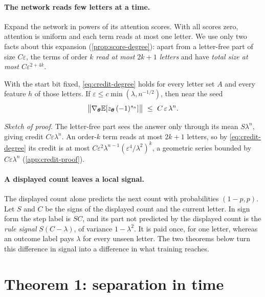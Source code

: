 \paragraph{The network reads few letters at a time.} Expand the network in powers of its attention scores.
With all scores zero, attention is uniform and each term reads at most one letter. We use only two facts
about this expansion (\cref{prop:score-degree}): apart from a letter-free part of size $C\varepsilon$, the terms of
order $k$ \emph{read at most $2k+1$ letters} and have \emph{total size at most $C\varepsilon^{2+4k}$}.

\begin{lemma}
\label{thm:main}
With the start bit fixed, \cref{eq:credit-degree} holds for every letter set $A$ and every feature $h$ of
those letters. If $\varepsilon\le c\min(\lambda,n^{-1/2})$, then near the seed
\[
 \bigl\|\nabla_{\bm\theta}\E[z_{\bm\theta}\,(-1)^{s_n}]\bigr\|\ \le\ C\,\varepsilon\,\lambda^{n}.
\]
\end{lemma}

\emph{Sketch of proof.} The letter-free part sees the answer only through its mean $S\lambda^n$, giving credit
$C\varepsilon\lambda^n$. An order-$k$ term reads at most $2k+1$ letters, so by \cref{eq:credit-degree} its credit is at most
$C\varepsilon^2\lambda^{n-1}(\varepsilon^4/\lambda^2)^k$, a geometric series bounded by $C\varepsilon\lambda^n$ (\cref{app:credit-proof}).

\paragraph{A displayed count leaves a local signal.} The displayed count alone predicts the next count with
probabilities $(1-p,p)$. Let $S$ and $C$ be the signs of the displayed count and the current letter. In sign form the
step label is $SC$, and its part not predicted by the displayed count is the \emph{rule signal} $S(C-\lambda)$, of variance
$1-\lambda^2$. It is paid once, for one letter, whereas an outcome label pays $\lambda$ for every unseen letter. The two
theorems below turn this difference in signal into a difference in what training reaches.

\section{Theorem 1: separation in time}
\label{sec:step}
\label{sec:time}

